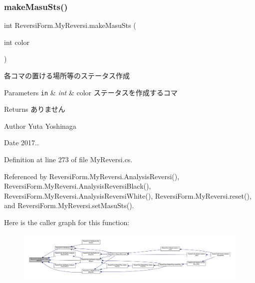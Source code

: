 \subsubsection{\texorpdfstring{make\+Masu\+Sts()}{makeMasuSts()}}
{\footnotesize\ttfamily int Reversi\+Form.\+My\+Reversi.\+make\+Masu\+Sts (\begin{DoxyParamCaption}\item[{int}]{color }\end{DoxyParamCaption})\hspace{0.3cm}{\ttfamily [private]}}



各コマの置ける場所等のステータス作成 


\begin{DoxyParams}[1]{Parameters}
\mbox{\tt in}  & {\em int} & color ステータスを作成するコマ \\
\hline
\end{DoxyParams}
\begin{DoxyReturn}{Returns}
ありません 
\end{DoxyReturn}
\begin{DoxyAuthor}{Author}
Yuta Yoshinaga 
\end{DoxyAuthor}
\begin{DoxyDate}{Date}
2017.. 
\end{DoxyDate}


Definition at line 273 of file My\+Reversi.\+cs.



Referenced by Reversi\+Form.\+My\+Reversi.\+Analysis\+Reversi(), Reversi\+Form.\+My\+Reversi.\+Analysis\+Reversi\+Black(), Reversi\+Form.\+My\+Reversi.\+Analysis\+Reversi\+White(), Reversi\+Form.\+My\+Reversi.\+reset(), and Reversi\+Form.\+My\+Reversi.\+set\+Masu\+Sts().

Here is the caller graph for this function\+:
\nopagebreak
\begin{figure}[H]
\begin{center}
\leavevmode
\includegraphics[width=350pt]{class_reversi_form_1_1_my_reversi_a379ac04ab0e8e9fc819ef3ceeba63e58_icgraph}
\end{center}
\end{figure}
\mbox{\label{class_reversi_form_1_1_my_reversi_aa8d8e839466c63462954080353cd4a9e}} 
